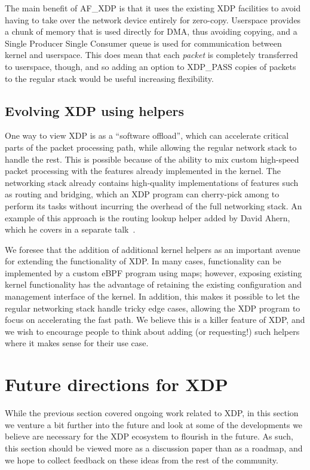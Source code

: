 \documentclass[sigconf]{acmart}
\begin{document}
The main benefit of AF\_XDP is that it uses the existing XDP facilities to avoid
having to take over the network device entirely for zero-copy. Userspace
provides a chunk of memory that is used directly for DMA, thus avoiding copying,
and a Single Producer Single Consumer queue is used for communication between
kernel and userspace. This does mean that each \emph{packet} is completely
transferred to userspace, though, and so adding an option to XDP\_PASS copies of
packets to the regular stack would be useful increasing flexibility.


\subsection{Evolving XDP using helpers}
\label{sec:evolving-xdp}

One way to view XDP is as a ``software offload'', which can accelerate critical
parts of the packet processing path, while allowing the regular network stack to
handle the rest. This is possible because of the ability to mix custom
high-speed packet processing with the features already implemented in the
kernel. The networking stack already contains high-quality implementations of
features such as routing and bridging, which an XDP program can cherry-pick
among to perform its tasks without incurring the overhead of the full networking
stack. An example of this approach is the routing lookup helper added by David
Ahern, which he covers in a separate talk~\cite{ahern-routing}.

We foresee that the addition of additional kernel helpers as an important avenue
for extending the functionality of XDP. In many cases, functionality can be
implemented by a custom eBPF program using maps; however, exposing existing
kernel functionality has the advantage of retaining the existing configuration
and management interface of the kernel. In addition, this makes it possible to
let the regular networking stack handle tricky edge cases, allowing the XDP
program to focus on accelerating the fast path. We believe this is a killer
feature of XDP, and we wish to encourage people to think about adding (or
requesting!) such helpers where it makes sense for their use case.

\section{Future directions for XDP}
\label{sec:future}
While the previous section covered ongoing work related to XDP, in this section
we venture a bit further into the future and look at some of the developments we
believe are necessary for the XDP ecosystem to flourish in the future. As such,
this section should be viewed more as a discussion paper than as a roadmap, and
we hope to collect feedback on these ideas from the rest of the community.
\end{document}
